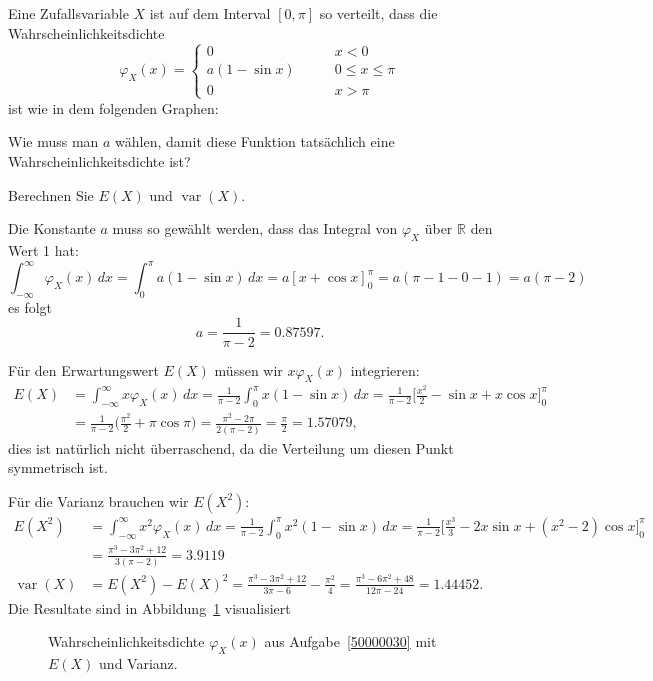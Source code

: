 Eine Zufallsvariable $X$ ist auf dem Interval $[0,\pi]$ so verteilt,
dass die Wahrscheinlichkeitsdichte
\[
\varphi_X(x)
=
\begin{cases}
0&\qquad x < 0\\
a(1-\sin x)&\qquad 0\le x \le \pi\\
0&\qquad x > \pi
\end{cases}
\]
ist wie in dem folgenden Graphen:
\begin{center}
\end{center}
\begin{teilaufgaben}
\item
Wie muss man $a$ wählen, damit diese Funktion tatsächlich 
eine Wahrscheinlichkeitsdichte ist?
\item
Berechnen Sie $E(X)$ und $\operatorname{var}(X)$.
\end{teilaufgaben}


\begin{loesung}
\begin{teilaufgaben}
\item Die Konstante $a$ muss so gewählt werden, dass das Integral von
$\varphi_X$ über $\mathbb R$ den Wert 1 hat:
\[
\int_{-\infty}^{\infty}\varphi_X(x)\,dx
=
\int_0^\pi a(1-\sin x)\,dx
=
a[x+\cos x]_0^\pi
=
a(\pi - 1 - 0 - 1) = a(\pi-2)
\]
es folgt
\[
a=\frac1{\pi -2}=0.87597.
\]
\item
Für den Erwartungswert $E(X)$ müssen wir $x\varphi_X(x)$ integrieren:
\begin{align*}
E(X)
&=
\int_{-\infty}^\infty x\varphi_X(x)\,dx
=
\frac1{\pi-2}\int_0^\pi x(1-\sin x)\,dx
=
\frac1{\pi - 2} \biggl[\frac{x^2}{2}-\sin x + x\cos x\biggr]_0^\pi
\\
&=
\frac1{\pi - 2}\biggl(\frac{\pi^2}{2} +\pi\cos\pi\biggr)
=
\frac{\pi^2-2\pi}{2(\pi-2)}=\frac{\pi}{2} = 1.57079,
\end{align*}
dies ist natürlich nicht überraschend, da die Verteilung um diesen
Punkt symmetrisch ist.

Für die Varianz brauchen wir $E(X^2)$:
\begin{align*}
E(X^2)
&=
\int_{-\infty}^\infty x^2\varphi_X(x)\,dx
=
\frac1{\pi-2}\int_0^\pi x^2(1-\sin x)\,dx
=
\frac1{\pi-2}\biggl[
\frac{x^3}{3}-2x\sin x+(x^2-2)\cos x
\biggr]_0^\pi
\\
&=
\frac{\pi^3-3\pi^2+12}{3(\pi-2)}
=
3.9119
\\
\operatorname{var}(X)
&=
E(X^2)-E(X)^2
=
\frac{\pi^3-3\pi^2+12}{3\pi - 6}
-
\frac{\pi^2}{4}
=
\frac {\pi^3-6\pi^2+48}{12\pi-24}
=
1.44452.
\end{align*}
Die Resultate sind in Abbildung~\ref{50000030:graphplus} visualisiert
\begin{figure}
\centering
{}
\caption{Wahrscheinlichkeitsdichte $\varphi_X(x)$ aus Aufgabe~\ref{50000030}
mit $E(X)$ und Varianz.
\label{50000030:graphplus}}
\end{figure}
\end{teilaufgaben}
\end{loesung}

